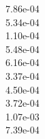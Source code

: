 7.86e-04 \\
5.34e-04 \\
1.10e-04 \\
5.48e-04 \\
6.16e-04 \\
3.37e-04 \\
4.50e-04 \\
3.72e-04 \\
1.07e-03 \\
7.39e-04 \\
